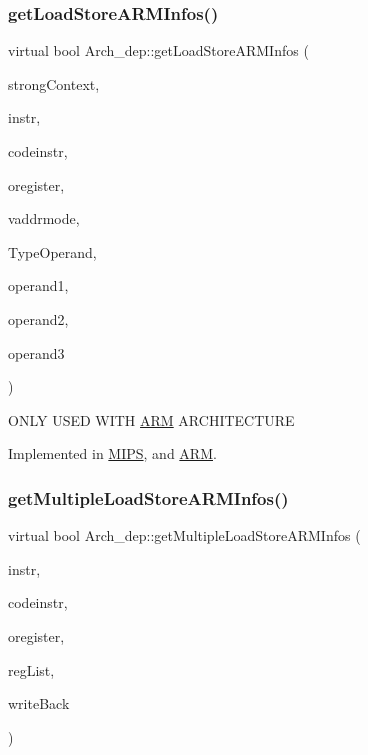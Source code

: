 \subsubsection{\texorpdfstring{get\+Load\+Store\+A\+R\+M\+Infos()}{getLoadStoreARMInfos()}}
{\footnotesize\ttfamily virtual bool Arch\+\_\+dep\+::get\+Load\+Store\+A\+R\+M\+Infos (\begin{DoxyParamCaption}\item[{bool}]{strong\+Context,  }\item[{string \&}]{instr,  }\item[{string \&}]{codeinstr,  }\item[{string \&}]{oregister,  }\item[{\hyperlink{arch_8h_aa5cfff0cd9c5ad5ebda7aeecc4a50c2b}{Addressing\+Mode} $\ast$}]{vaddrmode,  }\item[{\hyperlink{arch_8h_a63b66e201ffc27bbc8f89c8808382044}{offset\+Type} $\ast$}]{Type\+Operand,  }\item[{string \&}]{operand1,  }\item[{string \&}]{operand2,  }\item[{string \&}]{operand3 }\end{DoxyParamCaption})\hspace{0.3cm}{\ttfamily [pure virtual]}}

O\+N\+LY U\+S\+ED W\+I\+TH \hyperlink{classARM}{A\+RM} A\+R\+C\+H\+I\+T\+E\+C\+T\+U\+RE 

Implemented in \hyperlink{classMIPS_a2aa733a21db8dc973feddaac233d66a2}{M\+I\+PS}, and \hyperlink{classARM_acb46d6be8fd6799ed147be2b86991897}{A\+RM}.

\mbox{\label{classArch__dep_a6d74b532181cea3a40eb28b262a9f6f5}} 
\subsubsection{\texorpdfstring{get\+Multiple\+Load\+Store\+A\+R\+M\+Infos()}{getMultipleLoadStoreARMInfos()}}
{\footnotesize\ttfamily virtual bool Arch\+\_\+dep\+::get\+Multiple\+Load\+Store\+A\+R\+M\+Infos (\begin{DoxyParamCaption}\item[{string \&}]{instr,  }\item[{string \&}]{codeinstr,  }\item[{string \&}]{oregister,  }\item[{vector$<$ string $>$ \&}]{reg\+List,  }\item[{bool $\ast$}]{write\+Back }\end{DoxyParamCaption})\hspace{0.3cm}{\ttfamily [pure virtual]}}




